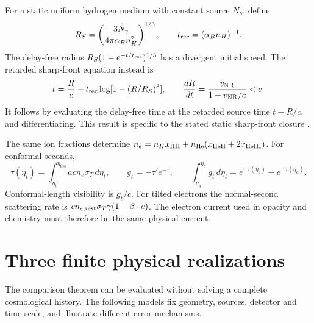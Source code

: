 For a static uniform hydrogen medium with constant source $\dot N_\gamma$, define
\begin{equation}
 R_S=\left(\frac{3\dot N_\gamma}{4\pi\alpha_Bn_H^2}\right)^{1/3},
 \qquad t_{\rm rec}=(\alpha_Bn_H)^{-1}.
 \label{v:front_scales}
\end{equation}
The delay-free radius $R_S(1-e^{-t/t_{\rm rec}})^{1/3}$ has a divergent initial speed.
The retarded sharp-front equation instead is
\begin{equation}
 t=\frac Rc-t_{\rm rec}\log[1-(R/R_S)^3],\qquad
 \frac{dR}{dt}=\frac{v_{\rm NR}}{1+v_{\rm NR}/c}<c .
 \label{v:causal_front}
\end{equation}
It follows by evaluating the delay-free time at the retarded source time $t-R/c$, and differentiating. This result is specific to the stated static sharp-front closure \cite{IVShapiro2006}.

The same ion fractions determine
$n_e=n_Hx_{\rm HII}+n_{\rm He}(x_{\rm HeII}+2x_{\rm HeIII})$.
For conformal seconds,
\begin{equation}
 \tau(\eta_t)=\int_{\eta_t}^{\eta_{t,0}}acn_e\sigma_T\,d\eta_t,\qquad
 g_t=-\tau'e^{-\tau},\qquad
 \int_{\eta_a}^{\eta_b}g_t\,d\eta_t
 =e^{-\tau(\eta_b)}-e^{-\tau(\eta_a)} .
 \label{v:visibility}
\end{equation}
Conformal-length visibility is $g_t/c$. For tilted electrons the normal-second scattering rate is $cn_{e,\rm rest}\sigma_T\gamma(1-\beta\cdot e)$. The electron current used in opacity and chemistry must therefore be the same physical current.

\section{Three finite physical realizations}
\label{v:applications}

The comparison theorem can be evaluated without solving a complete cosmological history. The following models fix geometry, sources, detector and time scale, and illustrate different error mechanisms.

